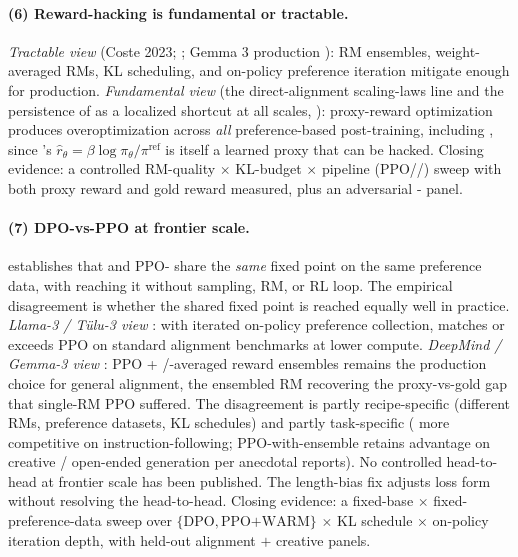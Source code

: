 \paragraph{(6) Reward-hacking is fundamental or tractable.}
\emph{Tractable view} (Coste 2023; \citealp{warm-2024,warp-2024};
Gemma 3 production \citep{gemma3}): RM ensembles, weight-averaged
RMs, KL scheduling, and on-policy preference iteration mitigate
 enough for production. \emph{Fundamental view} (the
direct-alignment scaling-laws line and
the persistence of  as a localized shortcut at all scales,
\citealp{sharma2023-sycophancy}): proxy-reward optimization produces
overoptimization across \emph{all} preference-based post-training,
including , since 's 
$\hat r_\theta = \beta \log \pi_\theta / \pi^{\mathrm{ref}}$ is itself
a learned proxy that can be hacked. Closing evidence: a controlled
RM-quality $\times$ KL-budget $\times$ pipeline (PPO//) sweep
with both proxy reward and gold reward measured, plus an adversarial
- panel.

\paragraph{(7) DPO-vs-PPO at frontier scale.}
\citet{rafailov2023-dpo} establishes that  and PPO- share
the \emph{same} fixed point on the same preference data, with 
reaching it without sampling, RM, or RL loop. The empirical
disagreement is whether the shared fixed point is reached equally
well in practice. \emph{Llama-3 / T\"ulu-3 view}
\citep{meta-llama3,tulu3}: with iterated on-policy preference
collection,  matches or exceeds PPO on standard alignment
benchmarks at lower compute. \emph{DeepMind / Gemma-3 view}
\citep{gemma3,warm-2024,warp-2024}: PPO + /-averaged reward
ensembles remains the production choice for general alignment, the
ensembled RM recovering the proxy-vs-gold gap that single-RM PPO
suffered. The disagreement is partly recipe-specific (different RMs,
preference datasets, KL schedules) and partly task-specific (
more competitive on instruction-following; PPO-with-ensemble retains
advantage on creative / open-ended generation per anecdotal reports).
No controlled head-to-head at frontier scale has been published. The
 length-bias fix \citep{meng2024-simpo} adjusts loss form
without resolving the head-to-head. Closing evidence: a
fixed-base $\times$ fixed-preference-data sweep over
$\{\text{DPO}, \text{PPO+WARM}\}$ $\times$ KL schedule $\times$
on-policy iteration depth, with held-out alignment $+$ creative panels.

